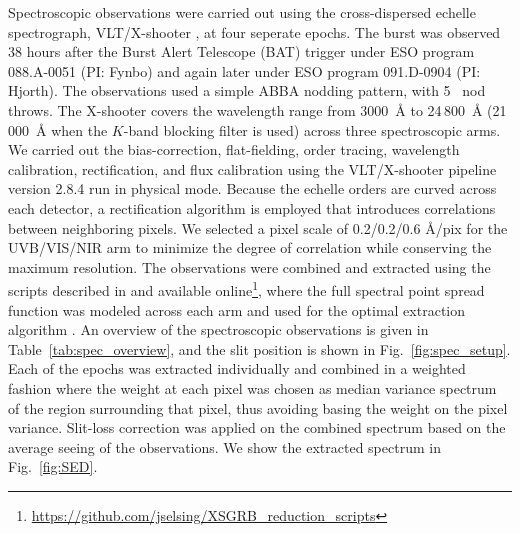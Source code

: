 \documentclass[longauth]{aa}    %
\begin{document}
Spectroscopic observations were carried out using the cross-dispersed echelle
spectrograph, VLT/X-shooter \citep{Vernet2011}, at four seperate epochs. The
burst was observed 38 hours after the Burst Alert Telescope (BAT) trigger under
ESO program 088.A-0051 (PI: Fynbo) and again later under ESO program
091.D-0904 (PI: Hjorth). The observations used a simple ABBA nodding pattern, with 5
\arcsec~nod throws. The X-shooter covers the wavelength range from 3000~\AA{} to
24\,800~\AA{} (21\,000~\AA{} when the $K$-band blocking filter is used) across
three spectroscopic arms. We carried out the bias-correction, flat-fielding,
order tracing, wavelength calibration, rectification, and flux calibration using
the VLT/X-shooter pipeline version 2.8.4 \citep{Goldoni2006, Modigliani2010} run
in physical mode. Because the echelle orders are curved across each detector, a
rectification algorithm is employed that introduces correlations between
neighboring pixels. We selected a pixel scale of 0.2/0.2/0.6 \AA/pix for the
UVB/VIS/NIR arm to minimize the degree of correlation while conserving the
maximum resolution. The observations were combined and extracted using the scripts
described in \citet{2018arXiv180207727S} and available
online\footnote{\url{https://github.com/jselsing/XSGRB_reduction_scripts}},
where the full spectral point spread function was modeled across each arm and
used for the optimal extraction algorithm \citep{Horne1986}. An overview of the
spectroscopic observations is given in Table~\ref{tab:spec_overview}, and the
slit position is shown in Fig.~\ref{fig:spec_setup}. Each of the epochs was
extracted individually and combined in a weighted fashion where the weight at
each pixel was chosen as median variance spectrum of the region surrounding that
pixel, thus avoiding basing the weight on the pixel variance. Slit-loss
correction was applied on the combined spectrum based on the average seeing
of the observations. We show the extracted spectrum in Fig.~\ref{fig:SED}.
\end{document}

